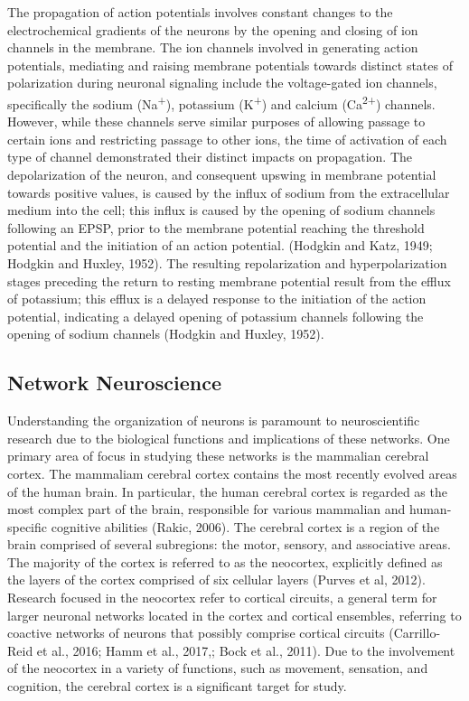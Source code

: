 \documentclass[11pt]{article}
\begin{document}
The propagation of action potentials involves constant changes to the electrochemical gradients of the neurons by the opening and closing of ion channels in the membrane. The ion channels involved in generating action potentials, mediating and raising membrane potentials towards distinct states of polarization during neuronal signaling include the voltage-gated ion channels, specifically the sodium (Na\textsuperscript{+}), potassium (K\textsuperscript{+}) and calcium (Ca\textsuperscript{2+}) channels. However, while these channels serve similar purposes of allowing passage to certain ions and restricting passage to other ions, the time of activation of each type of channel demonstrated their distinct impacts on propagation. The depolarization of the neuron, and consequent upswing in membrane potential towards positive values, is caused by the influx of sodium from the extracellular medium into the cell; this influx is caused by the opening of sodium channels following an EPSP, prior to the membrane potential reaching the threshold potential and the initiation of an action potential. (Hodgkin and Katz, 1949; Hodgkin and Huxley, 1952). The resulting repolarization and hyperpolarization stages preceding the return to resting membrane potential result from the efflux of potassium; this efflux is a delayed response to the initiation of the action potential, indicating a delayed opening of potassium channels following the opening of sodium channels (Hodgkin and Huxley, 1952).\par

\subsection{Network Neuroscience}
Understanding the organization of neurons is paramount to neuroscientific research due to the biological functions and implications of these networks. One primary area of focus in studying these networks is the mammalian cerebral cortex. The mammaliam cerebral cortex contains the most recently evolved areas of the human brain. In particular, the human cerebral cortex is regarded as the most complex part of the brain, responsible for various mammalian and human-specific cognitive abilities (Rakic, 2006). The cerebral cortex is a region of the brain comprised of several subregions: the motor, sensory, and associative areas. The majority of the cortex is referred to as the neocortex, explicitly defined as the layers of the cortex comprised of six cellular layers (Purves et al, 2012). %
Research focused in the neocortex refer to cortical circuits, a general term for larger neuronal networks located in the cortex and cortical ensembles, referring to coactive networks of neurons that possibly comprise cortical circuits (Carrillo-Reid et al., 2016; Hamm et al., 2017,; Bock et al., 2011). Due to the involvement of the neocortex in a variety of functions, such as movement, sensation, and cognition, the cerebral cortex is a significant target for study.\par
\end{document}
